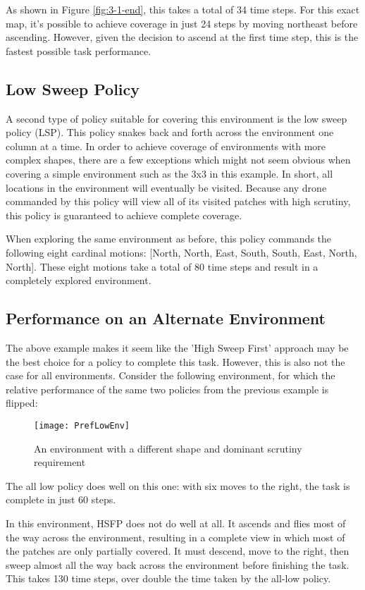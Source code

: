 As shown in Figure \ref{fig:3-1-end}, this takes a total of 34 time steps. For this exact map, it's possible to achieve coverage in just 24 steps by moving northeast before ascending. However, given the decision to ascend at the first time step, this is the fastest possible task performance.

\subsection{Low Sweep Policy}

A second type of policy suitable for covering this environment is the low sweep policy (LSP). This policy snakes back and forth across the environment one column at a time. In order to achieve coverage of environments with more complex shapes, there are a few exceptions which might not seem obvious when covering a simple environment such as the 3x3 in this example. In short, all locations in the environment will eventually be visited. Because any drone commanded by this policy will view all of its visited patches with high scrutiny, this policy is guaranteed to achieve complete coverage.

When exploring the same environment as before, this policy commands the following eight cardinal motions: [North, North, East, South, South, East, North, North]. These eight motions take a total of 80 time steps and result in a completely explored environment.

\subsection{Performance on an Alternate Environment}

The above example makes it seem like the 'High Sweep First' approach may be the best choice for a policy to complete this task. However, this is also not the case for all environments. Consider the following environment, for which the relative performance of the same two policies from the previous example is flipped:

\begin{figure}[H]
\texttt{[image: PrefLowEnv]}
\caption[Long Thin Environment]{An environment with a different shape and dominant scrutiny requirement}
\label{fig:3-2-env}
\end{figure}

The all low policy does well on this one: with six moves to the right, the task is complete in just 60 steps.

In this environment, HSFP does not do well at all. It ascends and flies most of the way across the environment, resulting in a complete view in which most of the patches are only partially covered. It must descend, move to the right, then sweep almost all the way back across the environment before finishing the task. This takes 130 time steps, over double the time taken by the all-low policy.

